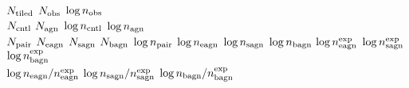              $N_{\rm tiled}$
               $N_{\rm obs}$
          $\log n_{\rm obs}$
\hline
{}\\
\hline               
	      $N_{\rm cntl}$
	       $N_{\rm agn}$
         $\log n_{\rm cntl}$
          $\log n_{\rm agn}$
\hline
{}\\
\hline
              $N_{\rm pair}$
              $N_{\rm eagn}$
              $N_{\rm sagn}$
              $N_{\rm bagn}$
         $\log n_{\rm pair}$
         $\log n_{\rm eagn}$
         $\log n_{\rm sagn}$
         $\log n_{\rm bagn}$
$\log n_{\rm eagn}^{\rm exp}$
$\log n_{\rm sagn}^{\rm exp}$
$\log n_{\rm bagn}^{\rm exp}$
\hline
{}\\
\hline
$\log n_{\rm eagn}/n_{\rm eagn}^{\rm exp}$
$\log n_{\rm sagn}/n_{\rm sagn}^{\rm exp}$
$\log n_{\rm bagn}/n_{\rm bagn}^{\rm exp}$
